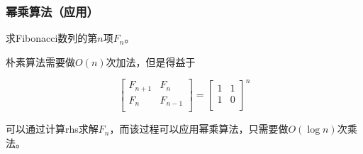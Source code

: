 \documentclass{ctexbeamer}
\begin{document}
    \begin{frame}
        \frametitle{幂乘算法（应用）}

        求Fibonacci数列的第$n$项$F_n$。

        朴素算法需要做$O(n)$次加法，但是得益于

        $$
        \begin{bmatrix}
            F_{n+1} & F_{n} \\
            F_{n} & F_{n-1} \\
        \end{bmatrix}
        =
        \begin{bmatrix}
            1 & 1 \\
            1 & 0 \\
        \end{bmatrix} ^ n
        $$

        可以通过计算rhs求解$F_n$，而该过程可以应用幂乘算法，只需要做$O(\log n)$次乘法。

    \end{frame}


    
\end{document}
